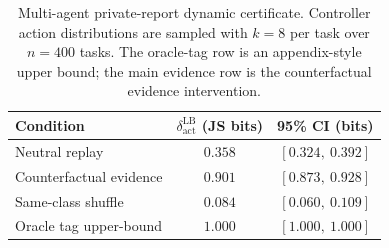 \begin{table}[t]
\centering
\begin{tabular}{lcc}
\toprule
Condition & $\delta_\text{act}^\text{LB}$ (JS bits) & 95\% CI (bits) \\
\midrule
Neutral replay & $0.358$ & $[0.324,\ 0.392]$ \\
Counterfactual evidence & $0.901$ & $[0.873,\ 0.928]$ \\
Same-class shuffle & $0.084$ & $[0.060,\ 0.109]$ \\
Oracle tag upper-bound & $1.000$ & $[1.000,\ 1.000]$ \\
\bottomrule
\end{tabular}
\caption{Multi-agent private-report dynamic certificate. Controller action distributions are sampled with $k=8$ per task over $n=400$ tasks. The oracle-tag row is an appendix-style upper bound; the main evidence row is the counterfactual evidence intervention.}
\label{tab:multi-agent-dynamic}
\end{table}
